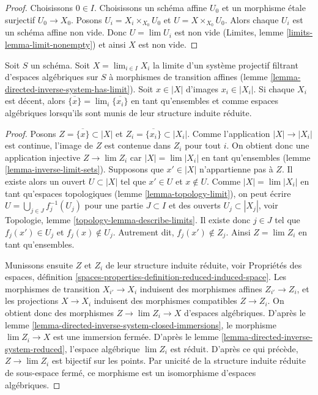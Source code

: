 \begin{proof}
Choisissons $0 \in I$.
Choisissons un schéma affine $U_0$ et un morphisme \'etale surjectif $U_0 \to X_0$.
Posons $U_i = X_i \times_{X_0} U_0$ et $U = X \times_{X_0} U_0$.
Alors chaque $U_i$ est un schéma affine non vide. Donc $U = \lim U_i$
est non vide (Limites, lemme \ref{limits-lemma-limit-nonempty}) et ainsi
$X$ est non vide.
\end{proof}

\begin{lemma}
\label{lemma-inverse-limit-irreducibles}
Soit $S$ un schéma. Soit $X = \lim_{i \in I} X_i$ la limite d'un système
projectif filtrant d'espaces algébriques sur $S$ à morphismes de transition affines
(lemme \ref{lemma-directed-inverse-system-has-limit}).
Soit $x \in |X|$ d'images $x_i \in |X_i|$. Si chaque $X_i$ est décent,
alors $\overline{\{x\}} = \lim_i \overline{\{x_i\}}$ en tant qu'ensembles
et comme espaces algébriques lorsqu'ils sont munis de leur structure induite réduite.
\end{lemma}

\begin{proof}
Posons $Z = \overline{\{x\}} \subset |X|$ et
$Z_i = \overline{\{x_i\}} \subset |X_i|$.
Comme l'application $|X| \to |X_i|$ est continue, l'image de $Z$ est contenue dans $Z_i$
pour tout $i$. On obtient donc une application injective $Z \to \lim Z_i$
car $|X| = \lim |X_i|$ en tant qu'ensembles (lemme \ref{lemma-inverse-limit-sets}).
Supposons que $x' \in |X|$ n'appartienne pas à $Z$.
Il existe alors un ouvert $U \subset |X|$ tel que $x' \in U$
et $x \not \in U$. Comme
$|X| = \lim |X_i|$ en tant qu'espaces topologiques (lemme \ref{lemma-topology-limit}),
on peut écrire $U = \bigcup_{j \in J} f_j^{-1}(U_j)$
pour une partie $J \subset I$ et des ouverts $U_j \subset |X_j|$, voir
Topologie, lemme \ref{topology-lemma-describe-limits}.
Il existe donc $j \in J$ tel que $f_j(x') \in U_j$
et $f_j(x) \not \in U_j$. Autrement dit, $f_j(x') \not \in Z_j$.
Ainsi $Z = \lim Z_i$ en tant qu'ensembles.

\medskip\noindent
Munissons ensuite $Z$ et $Z_i$ de leur structure induite réduite, voir
Propriétés des espaces, définition
\ref{spaces-properties-definition-reduced-induced-space}.
Les morphismes de transition $X_{i'} \to X_i$ induisent des morphismes affines
$Z_{i'} \to Z_i$, et les projections $X \to X_i$
induisent des morphismes compatibles $Z \to Z_i$.
On obtient donc des morphismes $Z \to \lim Z_i \to X$ d'espaces algébriques.
D'après le lemme \ref{lemma-directed-inverse-system-closed-immersions},
le morphisme $\lim Z_i \to X$ est une
immersion fermée. D'après le lemme \ref{lemma-directed-inverse-system-reduced},
l'espace algébrique $\lim Z_i$ est réduit.
D'après ce qui précède, $Z \to \lim Z_i$ est bijectif sur les points.
Par unicité de la structure induite réduite de sous-espace fermé,
ce morphisme est un isomorphisme d'espaces algébriques.
\end{proof}

